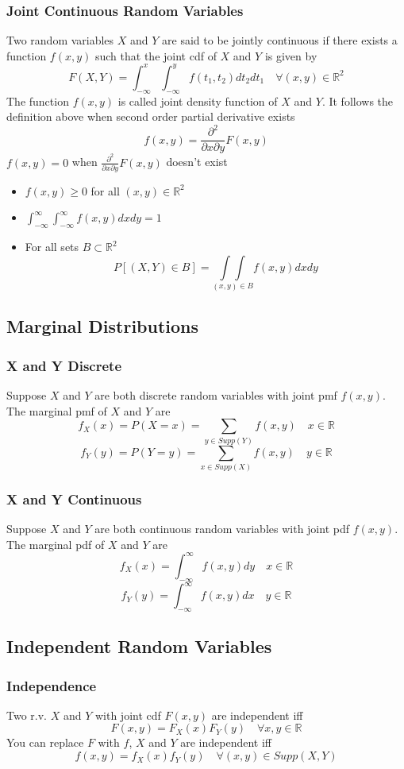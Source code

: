 \documentclass[11pt]{article}
\newcommand{\R}{{\mathbb{R}}}
\begin{document}
\subsubsection{Joint Continuous Random Variables}
Two random variables $X$ and $Y$ are said to be jointly continuous if there exists a function $f(x,y)$ such that the joint 
cdf of $X$ and $Y$ is given by 
\[F(X,Y)=\int_{-\infty}^{x}\int_{-\infty}^{y}f(t_1,t_2)dt_2dt_1\quad\forall(x,y)\in\R^2\]
The function $f(x,y)$ is called joint density function of $X$ and $Y$. It follows the definition 
above when second order partial derivative exists \[f(x,y)=\frac{\partial^2}{\partial x\partial y}F(x,y)\]
$f(x,y)=0$ when $\frac{\partial^2}{\partial x\partial y}F(x,y)$ doesn't exist 
\begin{itemize}
    \item $f(x,y)\geq0$ for all $(x,y)\in\R^2$
    \item $\int_{-\infty}^{\infty}\int_{-\infty}^{\infty}f(x,y)dxdy=1$
    \item For all sets $B\subset\R^2$ \[P[(X,Y)\in B]=\underset{(x,y)\in B}{\int\int} f(x,y)dxdy\]
\end{itemize}
\subsection{Marginal Distributions}
\subsubsection{X and Y Discrete}
Suppose $X$ and $Y$ are both discrete random variables with joint pmf $f(x,y)$.
The marginal pmf of $X$ and $Y$ are
\[f_X(x)=P(X=x)=\sum_{y\in Supp(Y)}f(x,y)\quad x\in\R\]
\[f_Y(y)=P(Y=y)=\sum_{x\in Supp(X)}f(x,y)\quad y\in\R\]
\subsubsection{X and Y Continuous}
Suppose $X$ and $Y$ are both continuous random variables with joint pdf $f(x,y)$.
The marginal pdf of $X$ and $Y$ are
\[f_X(x)=\int_{-\infty}^{\infty}f(x,y)dy\quad x\in\R\]
\[f_Y(y)=\int_{-\infty}^{\infty}f(x,y)dx\quad y\in\R\]
\subsection{Independent Random Variables}
\subsubsection{Independence}
Two r.v. $X$ and $Y$ with joint cdf $F(x,y)$ are independent iff
\[F(x,y)=F_X(x)F_Y(y)\quad\forall x,y\in\R\]
You can replace $F$ with $f$, $X$ and $Y$ are independent iff
\[f(x,y)=f_X(x)f_Y(y)\quad\forall(x,y)\in Supp(X,Y)\]
\end{document}
